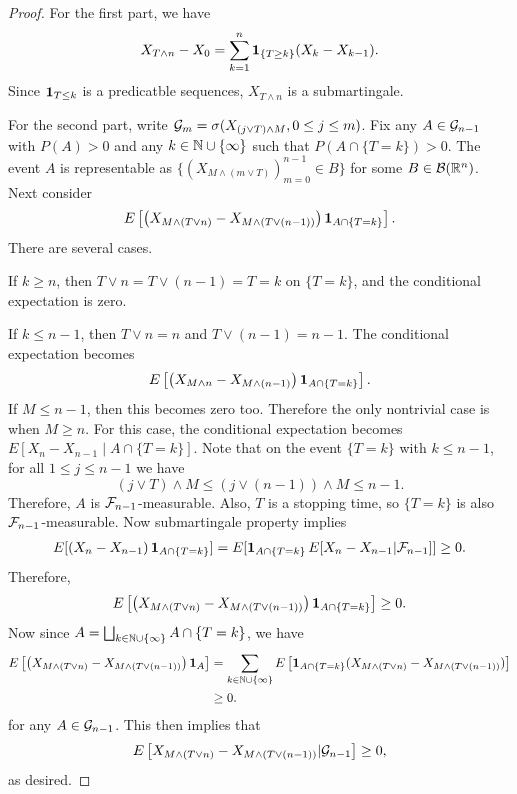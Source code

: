 \documentclass[a4paper]{article}
\begin{document}
\begin{proof}
  For the first part, we have 
  \[
  X_{T \wedge n} - X_0 = \sum_{k=1}^n \operatorname{\mathbf{1}}_{\{T \geq k\}} (X_k - X_{k - 1}).
  \]
  Since $\operatorname{\mathbf{1}}_{T \leq k}$ is a predicatble sequences, $X_{T \wedge n}$ 
  is a submartingale.

  For the second part, write $\mathcal{G}_{m} = \sigma (X_{(j \vee T) \wedge M}, 
  0 \leq j \leq m)$. Fix any $A \in \mathcal{G}_{n-1}$ with $P(A) > 0$ and 
  any $k \in \mathbb{N} \cup \{\infty\}$ such that $P(A \cap \{T = k\}) > 0$.
  The event $A$ is representable as 
  $\{ (X_{M \wedge (m \vee T)})_{m=0}^{n - 1} \in B \}$ for some 
  $B \in \mathcal{B}(\mathbb{R}^n)$. Next consider 
  \begin{align*}
    E \left[ \left( X_{M \wedge (T \vee n)} - X_{M \wedge (T \vee (n - 1))} \right)
    \operatorname{\mathbf{1}}_{ A \cap \{T = k\} } \right].
  \end{align*}
  There are several cases. 

  If $k \geq n$, then $T \vee n = T \vee (n - 1) = T = k$ 
  on $\{T = k\}$, and the conditional expectation is zero.

  If $k \leq n - 1$, then $T \vee n = n$ and $T \vee (n - 1) = n - 1$.
  The conditional expectation becomes 
  \[
  E \left[ \left( X_{M \wedge n} - X_{M \wedge (n - 1)} \right) 
  \operatorname{\mathbf{1}}_{ A \cap \{T = k\} } \right].
  \]
  If $M \leq n - 1$, then this becomes zero too. Therefore the only
  nontrivial case is when $M \geq n$. For this case, the conditional
  expectation becomes $E [X_n - X_{n - 1} \mid A \cap \{ T = k \}]$.
  Note that on the event $\{ T = k \}$ with $k \leq n - 1$, 
  for all $1 \leq j \leq n - 1$ we have 
  \[
  (j \vee T) \wedge M \leq (j \vee (n - 1)) \wedge M \leq n - 1.
  \]
  Therefore, $A$ is 
  $\mathcal{F}_{n - 1}$-measurable. Also, $T$ is a stopping time, so 
  $\{ T = k \}$ is also $\mathcal{F}_{n - 1}$-measurable. Now 
  submartingale property implies 
  \begin{align*}
    E [\left( X_n - X_{n - 1} \right) \operatorname{\mathbf{1}}_{A \cap \{ T = k \}}] 
    = E [\operatorname{\mathbf{1}}_{A \cap \{T = k\}} E[X_n - X_{n - 1} | \mathcal{F}_{n - 1}]] 
    \geq 0.
  \end{align*}
  Therefore, 
  \[
  E \left[ \left( X_{M \wedge (T \vee n)} - X_{M \wedge (T \vee (n - 1))} \right)
    \operatorname{\mathbf{1}}_{A \cap \{T = k\}} \right] \geq 0.
  \]
  Now since $A = \bigsqcup_{k \in \mathbb{N} \cup \{\infty\}} A \cap \{T = k\}$, 
  we have
  \begin{align*}
    E \left[ \left( X_{M \wedge (T \vee n)} - X_{M \wedge (T \vee (n - 1))} \right)
    \operatorname{\mathbf{1}}_A \right] 
    &= \sum_{k \in \mathbb{N} \cup \{\infty\}} 
    E \left[ \operatorname{\mathbf{1}}_{A \cap \{T = k\}} (X_{M \wedge (T \vee n)} - X_{M \wedge (T \vee (n - 1))})
    \right] \\
    &\geq 0.
  \end{align*}
  for any $A \in \mathcal{G}_{n - 1}$. This then implies that 
  \[
  E \left[ X_{M \wedge (T \vee n)} - X_{M \wedge (T \vee (n - 1))}
    | \mathcal{G}_{n - 1} \right] \geq 0,
  \]
  as desired.
\end{proof}
\end{document}
